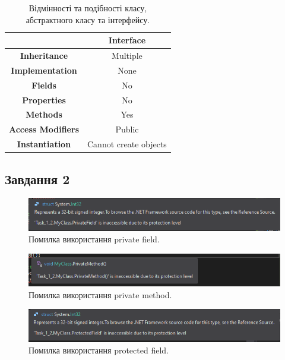 \documentclass[oneside,14pt]{extarticle}
\begin{document}
\begin{normalsize}
	\begin{table}[H]
		\centering
		\begin{tabular}{ |c|c| }
			\hline
			& \textbf{Interface} \\ 
			\hline
			\textbf{Inheritance} & Multiple \\ 
			\hline
			\textbf{Implementation} & None \\ 
			\hline
			\textbf{Fields} & No \\ 
			\hline
			\textbf{Properties} & No \\ 
			\hline
			\textbf{Methods} & Yes \\ 
			\hline
			\textbf{Access Modifiers} & Public \\ 
			\hline
			\textbf{Instantiation} & Cannot create objects \\ 
			\hline
		\end{tabular}
		\caption{Відмінності та подібності класу, абстрактного класу та інтерфейсу.}
	\end{table}
	
	\subsection*{Завдання 2}
		\begin{figure}[H]
		\centering
		\includegraphics[scale=0.7]{1_2_1}
		\caption{Помилка використання private field.}
	\end{figure}
	
	\begin{figure}[H]
		\centering
		\includegraphics[scale=0.7]{1_2_2}
		\caption{Помилка використання private method.}
	\end{figure}
	
	\begin{figure}[H]
		\centering
		\includegraphics[scale=0.7]{1_2_3}
		\caption{Помилка використання protected field.}
	\end{figure}
	

\end{normalsize}
\end{document}
